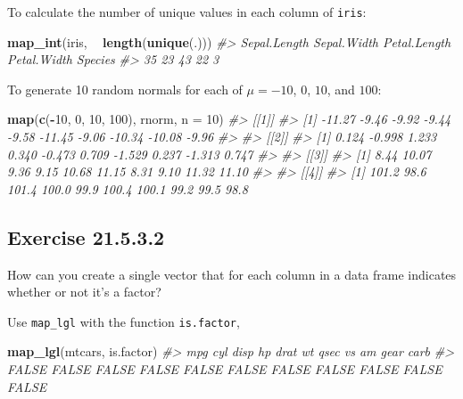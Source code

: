 \documentclass[]{book}
\newenvironment{Shaded}{\begin{snugshade}}{\end{snugshade}}
\newcommand{\CommentTok}[1]{\textcolor[rgb]{0.56,0.35,0.01}{\textit{#1}}}
\newcommand{\DataTypeTok}[1]{\textcolor[rgb]{0.13,0.29,0.53}{#1}}
\newcommand{\DecValTok}[1]{\textcolor[rgb]{0.00,0.00,0.81}{#1}}
\newcommand{\KeywordTok}[1]{\textcolor[rgb]{0.13,0.29,0.53}{\textbf{#1}}}
\newcommand{\NormalTok}[1]{#1}
\newcommand{\OperatorTok}[1]{\textcolor[rgb]{0.81,0.36,0.00}{\textbf{#1}}}
\newcommand{\StringTok}[1]{\textcolor[rgb]{0.31,0.60,0.02}{#1}}
\theoremstyle{plain}
\theoremstyle{remark}
\begin{document}
To calculate the number of unique values in each column of
\texttt{iris}:

\begin{Shaded}
\begin{Highlighting}[]
\KeywordTok{map_int}\NormalTok{(iris, }\OperatorTok{~}\StringTok{ }\KeywordTok{length}\NormalTok{(}\KeywordTok{unique}\NormalTok{(.)))}
\CommentTok{#> Sepal.Length  Sepal.Width Petal.Length  Petal.Width      Species }
\CommentTok{#>           35           23           43           22            3}
\end{Highlighting}
\end{Shaded}

To generate 10 random normals for each of \(\mu = -10\), \(0\), \(10\),
and \(100\):

\begin{Shaded}
\begin{Highlighting}[]
\KeywordTok{map}\NormalTok{(}\KeywordTok{c}\NormalTok{(}\OperatorTok{-}\DecValTok{10}\NormalTok{, }\DecValTok{0}\NormalTok{, }\DecValTok{10}\NormalTok{, }\DecValTok{100}\NormalTok{), rnorm, }\DataTypeTok{n =} \DecValTok{10}\NormalTok{)}
\CommentTok{#> [[1]]}
\CommentTok{#>  [1] -11.27  -9.46  -9.92  -9.44  -9.58 -11.45  -9.06 -10.34 -10.08  -9.96}
\CommentTok{#> }
\CommentTok{#> [[2]]}
\CommentTok{#>  [1]  0.124 -0.998  1.233  0.340 -0.473  0.709 -1.529  0.237 -1.313  0.747}
\CommentTok{#> }
\CommentTok{#> [[3]]}
\CommentTok{#>  [1]  8.44 10.07  9.36  9.15 10.68 11.15  8.31  9.10 11.32 11.10}
\CommentTok{#> }
\CommentTok{#> [[4]]}
\CommentTok{#>  [1] 101.2  98.6 101.4 100.0  99.9 100.4 100.1  99.2  99.5  98.8}
\end{Highlighting}
\end{Shaded}

\hypertarget{exercise-21.5.3.2}{%
\subsection*{\texorpdfstring{Exercise
{21.5.3.2}}{Exercise 21.5.3.2}}\label{exercise-21.5.3.2}}

How can you create a single vector that for each column in a data frame
indicates whether or not it's a factor?

Use \texttt{map\_lgl} with the function \texttt{is.factor},

\begin{Shaded}
\begin{Highlighting}[]
\KeywordTok{map_lgl}\NormalTok{(mtcars, is.factor)}
\CommentTok{#>   mpg   cyl  disp    hp  drat    wt  qsec    vs    am  gear  carb }
\CommentTok{#> FALSE FALSE FALSE FALSE FALSE FALSE FALSE FALSE FALSE FALSE FALSE}
\end{Highlighting}
\end{Shaded}
\end{document}
